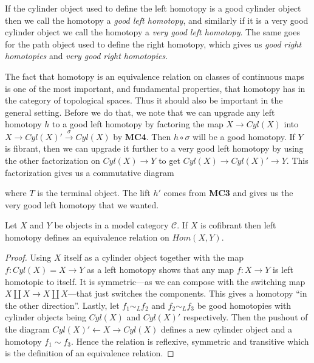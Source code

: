 If the cylinder object used to define the left homotopy is a good cylinder object then we call the homotopy a \emph{good left homotopy}, and similarly if it is a very good cylinder object we call the homotopy a \emph{very good left homotopy}. The same goes for the path object used to define the right homotopy, which gives us \emph{good right homotopies} and \emph{very good right homotopies}.

The fact that homotopy is an equivalence relation on classes of continuous maps is one of the most important, and fundamental properties, that homotopy has in the category of topological spaces. Thus it should also be important in the general setting. Before we do that, we note that we can upgrade any left homotopy $h$ to a good left homotopy by factoring the map $X\longrightarrow Cyl(X)$ into $X\longrightarrow Cyl(X)' \overset{\sigma}\longrightarrow Cyl(X)$ by \textbf{MC4}. Then $h\circ \sigma$ will be a good homotopy. If $Y$ is fibrant, then we can upgrade it further to a very good left homotopy by using the other factorization on $Cyl(X)\longrightarrow Y$ to get $Cyl(X)\longrightarrow Cyl(X)'\longrightarrow Y$. This factorization gives us a commutative diagram
\begin{center}
\end{center}
where $T$ is the terminal object. The lift $h'$ comes from \textbf{MC3} and gives us the very good left homotopy that we wanted. 

\begin{lemma}
Let $X$ and $Y$ be objects in a model category $\mathcal{C}$. If $X$ is cofibrant then left homotopy defines an equivalence relation on $Hom(X,Y)$.
\end{lemma}
\begin{proof}
Using $X$ itself as a cylinder object together with the map $f:Cyl(X)=X\longrightarrow Y$ as a left homotopy shows that any map $f:X\longrightarrow Y$ is left homotopic to itself. It is symmetric---as we can compose with the switching map $X\coprod X \longrightarrow X\coprod X$---that just switches the components. This gives a homotopy “in the other direction”. Lastly, let $f_1\sim_L f_2$ and $f_2\sim_L f_3$ be good homotopies with cylinder objects being $Cyl(X)$ and $Cyl(X)'$ respectively. Then the pushout of the diagram $Cyl(X)' \longleftarrow X \longrightarrow Cyl(X)$ defines a new cylinder object and a homotopy $f_1\sim f_3$. Hence the relation is reflexive, symmetric and transitive which is the definition of an equivalence relation.
\end{proof}

